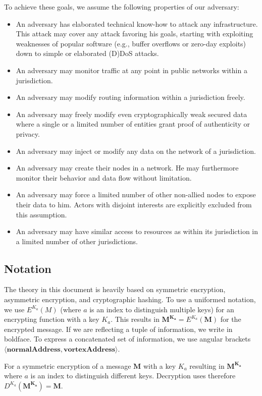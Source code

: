 \documentclass[acmsmall, screen]{acmart}
\begin{document}
To achieve these goals, we assume the following properties of our adversary:
\begin{itemize}
    \item An adversary has elaborated technical know-how to attack any infrastructure. This attack may cover any attack favoring his goals, starting with exploiting weaknesses of popular software (e.g., buffer overflows or zero-day exploits) down to simple or elaborated (D)DoS attacks.
	\item An adversary may monitor traffic at any point in public networks within a jurisdiction.
	\item An adversary may modify routing information within a jurisdiction freely.
	\item An adversary may freely modify even cryptographically weak secured data where a single or a limited number of entities grant proof of authenticity or privacy.
	\item An adversary may inject or modify any data on the network of a jurisdiction.
	\item An adversary may create their nodes in a network. He may furthermore monitor their behavior and data flow without limitation.
	\item An adversary may force a limited number of other non-allied nodes to expose their data to him. Actors with disjoint interests are explicitly excluded from this assumption.
	\item An adversary may have similar access to resources as within its jurisdiction in a limited number of other jurisdictions.
\end{itemize}

\subsection{Notation \label{sec:encNot}}
The theory in this document is heavily based on symmetric encryption, asymmetric encryption, and cryptographic hashing. To use a uniformed notation, we use $E^{K_a}(M)$ (where $a$ is an index to distinguish multiple keys) for an encrypting function with a key $K_a$. This results in $\mathbf{M^{K_a}}=E^{K_a}(\mathbf{M})$ for the encrypted message. If we are reflecting a tuple of information, we write in boldface. To express a concatenated set of information, we use angular brackets $\mathbf{\langle normalAddress,vortexAddress\rangle }$. 

For a symmetric encryption of a message $\mathbf{M}$ with a key $K_a$ resulting in $\mathbf{M^{K_a}}$ where $a$ is an index to distinguish different keys. Decryption uses therefore $D^{K_a}(\mathbf{M^{K_a}})=\mathbf{M}$.
\end{document}
